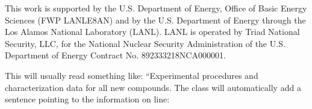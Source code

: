 \documentclass[journal=jctcce,manuscript=article]{achemso}
\begin{document}
\begin{acknowledgement}
This work is supported by the U.S. Department of Energy, Office of Basic Energy Sciences (FWP LANLE8AN) and by the U.S. Department of Energy through the Los Alamos National Laboratory (LANL). LANL is operated by Triad National Security, LLC, for the National Nuclear Security Administration of the U.S. Department of Energy Contract No. 892333218NCA000001.
\end{acknowledgement}

\begin{suppinfo}

This will usually read something like: ``Experimental procedures and
characterization data for all new compounds. The class will
automatically add a sentence pointing to the information on line:

\end{suppinfo}



% 

\end{document}
